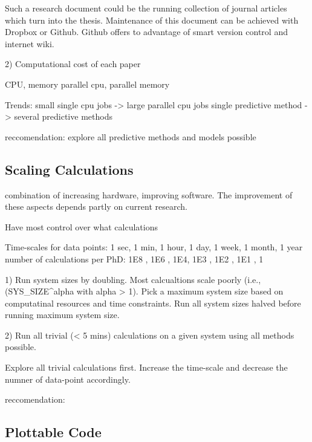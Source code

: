 \documentclass[letterpaper,12pt,amsmath,amssymb]{article}
\begin{document}
Such a research document could be the running 
collection of journal articles which turn into the thesis. Maintenance 
of this document can be achieved with Dropbox or Github.  Github 
offers to advantage of smart version control and internet wiki. 

2) Computational cost of each paper

CPU, memory
parallel cpu, parallel memory

Trends: 
small single cpu jobs -> large parallel cpu jobs
single predictive method -> several predictive methods

reccomendation: explore all predictive methods and models possible

\subsection{Scaling Calculations}

combination of increasing hardware, improving software.  The 
improvement of these aspects depends partly on current 
research.  

Have most control over what calculations

Time-scales for data points: 
1 sec, 1 min, 1 hour, 1 day, 1 week, 1 month, 1 year 
number of calculations per PhD:
1E8 , 1E6 , 1E4, 1E3 , 1E2 , 1E1 , 1

1) Run system sizes by doubling. Most calcualtions scale poorly (i.e., 
(SYS_SIZE^alpha with alpha > 1). Pick a maximum system size based 
on computatinal resources and time constraints.  Run all system sizes 
halved before running maximum system size. 

2) Run all trivial (< 5 mins) calculations on a given system using all 
methods possible. 

Explore all trivial calculations first. Increase the time-scale and 
decrease the numner of data-point accordingly. 

reccomendation: 

\subsection{Plottable Code}
\end{document}
